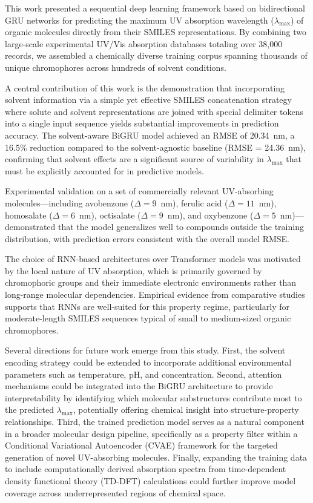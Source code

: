 \documentclass[11pt,a4paper]{article}
\begin{document}
This work presented a sequential deep learning framework based on bidirectional GRU networks 
for predicting the maximum UV absorption wavelength ($\lambda_{\max}$) of organic molecules 
directly from their SMILES representations. By combining two large-scale experimental UV/Vis 
absorption databases totaling over 38,000 records, we assembled a chemically diverse training 
corpus spanning thousands of unique chromophores across hundreds of solvent conditions.

A central contribution of this work is the demonstration that incorporating solvent information 
via a simple yet effective SMILES concatenation strategy where solute and solvent 
representations are joined with special delimiter tokens into a single input sequence yields 
substantial improvements in prediction accuracy. The solvent-aware BiGRU model achieved an 
RMSE of 20.34~nm, a 16.5\% reduction compared to the solvent-agnostic baseline (RMSE = 
24.36~nm), confirming that solvent effects are a significant source of variability in 
$\lambda_{\max}$ that must be explicitly accounted for in predictive models.

Experimental validation on a set of commercially relevant UV-absorbing molecules---including 
avobenzone ($\Delta = 9$~nm), ferulic acid ($\Delta = 11$~nm), homosalate ($\Delta = 6$~nm), 
octisalate ($\Delta = 9$~nm), and oxybenzone ($\Delta = 5$~nm)---demonstrated that the model 
generalizes well to compounds outside the training distribution, with prediction errors consistent 
with the overall model RMSE.

The choice of RNN-based architectures over Transformer models was motivated by the local 
nature of UV absorption, which is primarily governed by chromophoric groups and their immediate 
electronic environments rather than long-range molecular dependencies. Empirical evidence from 
comparative studies supports that RNNs are well-suited for this property regime, particularly 
for moderate-length SMILES sequences typical of small to medium-sized organic chromophores.

Several directions for future work emerge from this study. First, the solvent encoding strategy 
could be extended to incorporate additional environmental parameters such as temperature, pH, 
and concentration. Second, attention mechanisms could be integrated into the BiGRU architecture 
to provide interpretability by identifying which molecular substructures contribute most to the 
predicted $\lambda_{\max}$, potentially offering chemical insight into structure-property 
relationships. Third, the trained prediction model serves as a natural component in a broader 
molecular design pipeline, specifically as a property filter within a Conditional Variational 
Autoencoder (CVAE) framework for the targeted generation of novel UV-absorbing molecules. 
Finally, expanding the training data to include computationally derived absorption spectra from 
time-dependent density functional theory (TD-DFT) calculations could further improve model 
coverage across underrepresented regions of chemical space.
\end{document}
